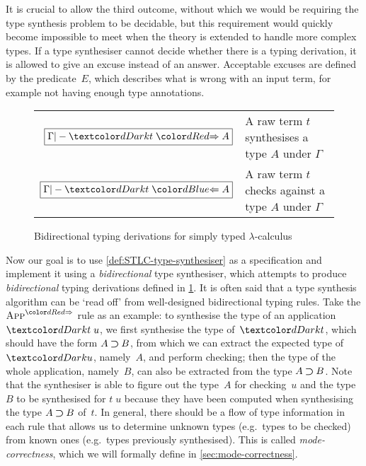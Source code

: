 It is crucial to allow the third outcome, without which we would be requiring the type synthesis problem to be decidable, but this requirement would quickly become impossible to meet when the theory is extended to handle more complex types.
If a type synthesiser cannot decide whether there is a typing derivation, it is allowed to give an excuse instead of an answer.
Acceptable excuses are defined by the predicate~$E$, which describes what is wrong with an input term, for example not having enough type annotations.

\begin{figure}
  \small
  \bgroup
  \renewcommand{\arraystretch}{1.5}
  \begin{tabular}{ r l }
    $\boxed{\Gamma |- \isTerm{t} \syn A}$ & A raw term $t$ synthesises a type $A$ under $\Gamma$ \\
    $\boxed{\Gamma |- \isTerm{t} \chk A}$ &A raw term $t$ checks against a type $A$ under $\Gamma$
  \end{tabular}
  \egroup
  \centering
  \caption{Bidirectional typing derivations for simply typed $\lambda$-calculus}
  \label{fig:STLC-bidirectional-typing-derivations}
\end{figure}

Now our goal is to use \cref{def:STLC-type-synthesiser} as a specification and implement it using a \emph{bidirectional} type synthesiser, which attempts to produce \emph{bidirectional} typing derivations defined in \cref{fig:STLC-bidirectional-typing-derivations}.
It is often said that a type synthesis algorithm can be `read off' from well-designed bidirectional typing rules.
Take the $\SynRule{App}$ rule as an example:
to synthesise the type of an application $\isTerm{t\;u}$, we first synthesise the type of~$\isTerm{t}$, which should have the form $A \mathbin{\bm{\supset}} B$, from which we can extract the expected type of~$\isTerm{u}$, namely~$A$, and perform checking; then the type of the whole application, namely~$B$, can also be extracted from the type $A \mathbin{\bm{\supset}} B$.
Note that the synthesiser is able to figure out the type~$A$ for checking~$u$ and the type~$B$ to be synthesised for $t\;u$ because they have been computed when synthesising the type $A \mathbin{\bm{\supset}} B$ of~$t$.
In general, there should be a flow of type information in each rule that allows us to determine unknown types (e.g.~types to be checked) from known ones (e.g.~types previously synthesised).
This is called \emph{mode-correctness}, which we will formally define in \cref{sec:mode-correctness}.

